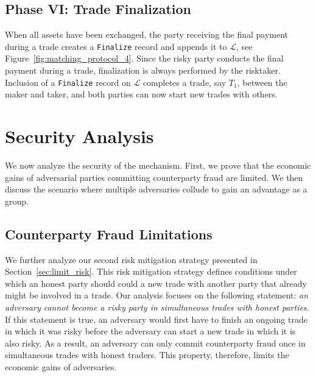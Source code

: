 \subsection*{Phase VI: Trade Finalization}
\label{sec:phase_finalization}
When all assets have been exchanged, the party receiving the final payment during a trade creates a \texttt{Finalize} record and appends it to $ \mathcal{L} $, see Figure~\ref{fig:matching_protocol_4}.
Since the risky party conducts the final payment during a trade, finalization is always performed by the risktaker.
Inclusion of a \texttt{Finalize} record on $ \mathcal{L} $ completes a trade, say $ T_1 $, between the maker and taker, and both parties can now start new trades with others.

\section{Security Analysis}
\label{sec:analysis}
We now analyze the security of the \ModelName{} mechanism.
First, we prove that the economic gains of adversarial parties committing counterparty fraud are limited.
We then discuss the scenario where multiple adversaries collude to gain an advantage as a group.

\subsection{Counterparty Fraud Limitations}
We further analyze our second risk mitigation strategy presented in Section~\ref{sec:limit_risk}.
This risk mitigation strategy defines conditions under which an honest party should could a new trade with another party that already might be involved in a trade.
Our analysis focuses on the following statement: \emph{an adversary cannot become a risky party in simultaneous trades with honest parties.}
If this statement is true, an adversary would first have to finish an ongoing trade in which it was risky before the adversary can start a new trade in which it is also risky.
As a result, an adversary can only commit counterparty fraud once in simultaneous trades with honest traders.
This property, therefore, limits the economic gains of adversaries.

